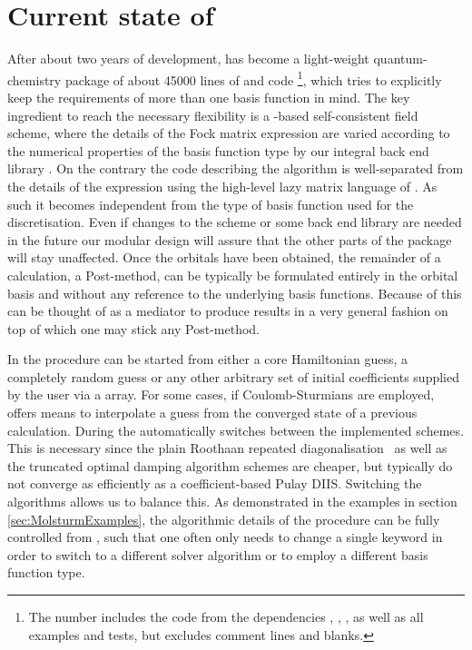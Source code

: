 \section{Current state of \molsturm}
\label{sec:MolsturmState}

After about two years of development,
\molsturm has become a light-weight quantum-chemistry package of about 45000
lines of \cpp and \python code%
\footnote{The number includes the code from the dependencies
\gint, \gscf, \lazyten, \krims as well as
all examples and tests, but excludes comment lines and blanks.},
which tries to explicitly keep the requirements of more than
one basis function in mind.
The key ingredient to reach the necessary flexibility
is a \contraction-based self-consistent field scheme,
where the details of the Fock matrix \contraction expression
are varied according to the numerical properties of the basis function type
by our integral back end library \gint.
On the contrary the code describing the \SCF algorithm
is well-separated from the details of the \contraction expression
using the high-level lazy matrix language of \lazyten.
As such it becomes independent from the type of basis function used for the discretisation.
Even if changes to the \SCF scheme or some back end
library are needed in the future our modular design
will assure that the other parts of the \molsturm package will stay unaffected.
Once the \SCF orbitals have been obtained,
the remainder of a calculation, \eg a Post-\HF method,
can be typically be formulated entirely in the \SCF orbital basis
and without any reference to the underlying basis functions.
Because of this \molsturm can be thought of as a mediator
to produce \SCF results in a very general fashion
on top of which one may stick any Post-\HF method.

In \molsturm the \SCF procedure can be started from either a core Hamiltonian guess,
a completely random guess or any other arbitrary set of initial
coefficients supplied by the user via a \numpy array.
For some cases, \eg if Coulomb-Sturmians are employed,
\molsturm offers means to interpolate a guess
from the converged state of a previous calculation.
During the \SCF \molsturm automatically switches between
the implemented \SCF schemes.
This is necessary since the plain Roothaan
repeated diagonalisation~\cite{Roothaan1951}
as well as the truncated optimal damping algorithm schemes
are cheaper, but typically do not converge as efficiently
as a coefficient-based Pulay DIIS.
Switching the algorithms allows us to balance this.
As demonstrated in the examples in section \ref{sec:MolsturmExamples},
the algorithmic details of the \SCF procedure can be fully controlled
from \python,
such that one often only needs to change a single keyword
in order to switch to a different solver algorithm
or to employ a different basis function type.

